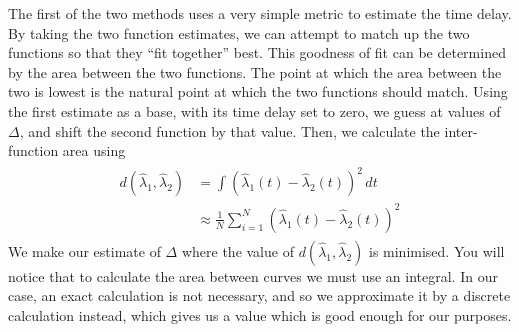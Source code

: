 \documentclass[a4paper,11pt]{article}
\begin{document}
The first of the two methods uses a very simple metric to estimate the time
delay. By taking the two function estimates, we can attempt to match up the two
functions so that they ``fit together'' best. This goodness of fit can be
determined by the area between the two functions. The point at which the area
between the two is lowest is the natural point at which the two functions should
match. Using the first estimate as a base, with its time delay set to zero, we
guess at values of $\Delta$, and shift the second function by that value. Then,
we calculate the inter-function area using
\begin{align}
\begin{split}
d(\hat{\lambda}_1,\hat{\lambda}_2)&=\int(\hat{\lambda}_1(t)-\hat{\lambda}_2(t))^2\,dt\\
&\approx\frac{1}{N}\sum_{i=1}^N(\hat{\lambda}_1(t)-\hat{\lambda}_2(t))^2
\end{split}
\end{align}
We make our estimate of $\Delta$ where the value of
$d(\hat{\lambda}_1,\hat{\lambda}_2)$ is minimised. You will notice that to
calculate the area between curves we must use an integral. In our case, an exact
calculation is not necessary, and so we approximate it by a discrete calculation
instead, which gives us a value which is good enough for our purposes.
      
\end{document}
